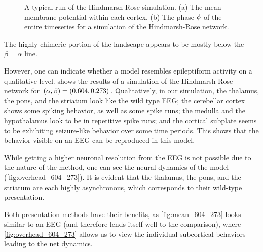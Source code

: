 \begin{figure}[ht]
  \centering

  \caption[Typical simulation]{A typical run of the Hindmarsh-Rose simulation.
    (a) The mean membrane potential within each cortex.
    (b) The phase $\phi$ of the entire timeseries for a simulation of the Hindmarsh-Rose network.
  }
  \label{fig:058_010}
\end{figure}

The highly chimeric portion of the landscape appears to be mostly below the $\beta = \alpha$ line.

However, one can indicate whether a model resembles epileptiform activity on a qualitative level.
 shows the results of a simulation of the Hindmarsh-Rose network for $\pqty{\hra, \hrb} = \pqty{0.604, 0.273}$.
Qualitatively, in our simulation,
the thalamus, the pons, and the striatum look like the wild type EEG;
the cerebellar cortex shows some spiking behavior,
as well as some spike runs;
the medulla and the hypothalamus look to be in repetitive spike runs;
and the cortical subplate seems to be exhibiting seizure-like behavior over some time periods.
This shows that the behavior visible on an EEG can be reproduced in this model.

While getting a higher neuronal resolution from the EEG is not possible due to the nature of the method,
one can see the neural dynamics of the model (\cref{fig:overhead_604_273}).
It is evident that the thalamus, the pons, and the striatum are each highly asynchronous, which corresponds to their wild-type presentation.

Both presentation methods have their benefits, as \cref{fig:mean_604_273} looks similar to an EEG (and therefore lends itself well to the comparison), where \cref{fig:overhead_604_273} allows us to view the individual subcortical behaviors leading to the net dynamics.
